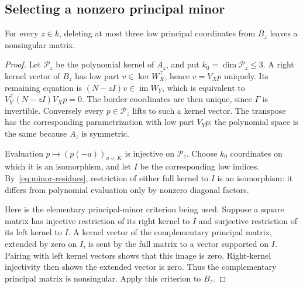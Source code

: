 \subsection{Selecting a nonzero principal minor}
\begin{lemma}\label{lem:minor-rescue}
For every $z\in k$, deleting at most three low principal coordinates from
$B_z$ leaves a nonsingular matrix.
\end{lemma}
\begin{proof}
Let $\mathcal P_z$ be the polynomial kernel of $A_z$, and put
$k_0=\dim\mathcal P_z\le3$. A right kernel vector of $B_z$ has low
part $v\in\ker W_X^{\top}$, hence $v=V_Xp$ uniquely. Its remaining
equation is $(N-zI)v\in\operatorname{im}W_Y$, which is equivalent to
$V_Y^{\top}(N-zI)V_Xp=0$. The border coordinates are then unique,
since $\Gamma$ is invertible. Conversely every $p\in\mathcal P_z$
lifts to such a kernel vector. The transpose has the corresponding
parametrization with low part $V_Yp$; the polynomial space is the same
because $A_z$ is symmetric.

Evaluation $p\mapsto(p(-a))_{a<K}$ is injective on $\mathcal P_z$.
Choose $k_0$ coordinates on which it is an isomorphism, and let $I$ be
the corresponding low indices. By~\eqref{eq:minor-residues}, restriction
of either full kernel to $I$ is an isomorphism: it differs from polynomial
evaluation only by nonzero diagonal factors.

Here is the elementary principal-minor criterion being used. Suppose a
square matrix has injective restriction of its right kernel to $I$ and
surjective restriction of its left kernel to $I$. A kernel vector of
the complementary principal matrix, extended by zero on $I$, is sent by
the full matrix to a vector supported on $I$. Pairing with left kernel
vectors shows that this image is zero. Right-kernel injectivity then
shows the extended vector is zero. Thus the complementary principal
matrix is nonsingular. Apply this criterion to $B_z$.
\end{proof}


